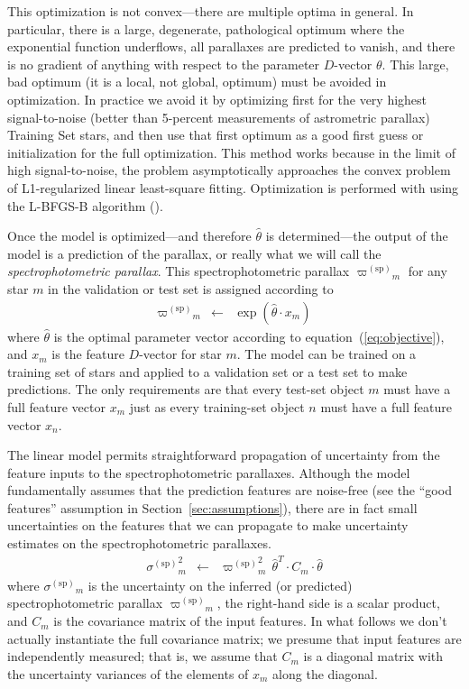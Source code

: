 \documentclass[modern]{aastex62}
\newcommand{\sectionname}{Section}
\newcommand{\equationname}{equation}
\newcommand{\code}[1]{\texttt{\detokenize{#1}}}
\newcommand{\acronym}[1]{{\small{#1}}}
\newcommand{\sparallax}{{\varpi^{(\mathrm{sp})}}}
\newcommand{\ssigma}{{\sigma^{(\mathrm{sp})}}}
\begin{document}
This optimization is not convex---there are multiple optima in general.
In particular, there is a large, degenerate, pathological optimum where
the exponential function underflows, all parallaxes are predicted to vanish,
and there is no gradient of anything with respect to the parameter $D$-vector $\theta$.
This large, bad optimum (it is a local, not global, optimum) must be avoided in optimization.
In practice we avoid it by optimizing first for the very highest signal-to-noise
(better than 5-percent measurements of astrometric parallax)
Training Set stars, and then use that first optimum as a
good first guess or initialization for the full optimization.
This method works because in the limit of high signal-to-noise, the problem asymptotically approaches
the convex problem of L1-regularized linear least-square fitting.
Optimization is performed with \code{scipy.optimize} using the
\acronym{L-BFGS-B} algorithm (\citealt{lbfgsb}).

Once the model is optimized---and therefore $\hat{\theta}$ is determined---the
output of the model is a prediction of the parallax,
or really what we will call the \emph{spectrophotometric parallax}.
This spectrophotometric parallax
$\sparallax_m$ for any star $m$ in the validation or test set is
assigned according to
\begin{eqnarray}
\sparallax_m &\leftarrow& \exp(\hat{\theta}\cdot x_m)
\end{eqnarray}
where
$\hat{\theta}$ is the optimal parameter vector according
to \equationname~(\ref{eq:objective}),
and
$x_m$ is the feature $D$-vector for star $m$.
The model can be trained on a training set of stars and applied to
a validation set or a test set to make predictions.
The only requirements are that every test-set object $m$  must have a full feature
vector $x_m$ just as every training-set object $n$ must have a full feature
vector $x_n$.

The linear model permits straightforward propagation of uncertainty from the
feature inputs to the spectrophotometric parallaxes.
Although the model fundamentally assumes that the prediction features are noise-free
(see the ``good features'' assumption in \sectionname~\ref{sec:assumptions}),
there are in fact small uncertainties on the features that we can propagate to 
make uncertainty estimates on the spectrophotometric parallaxes.
\begin{eqnarray}
\ssigma_m^2 &\leftarrow& \sparallax_m^2\,\hat{\theta}^T\cdot C_m\cdot\hat{\theta}
\label{eq:unc}
\end{eqnarray}
where $\ssigma_m$ is the uncertainty on the inferred (or predicted)
spectrophotometric parallax $\sparallax_m$,
the right-hand side is a scalar product,
and $C_m$ is the covariance matrix of the input
features.
In what follows we don't actually instantiate the full covariance matrix; we presume
that input features are independently measured;
that is, we assume that $C_m$ is a diagonal matrix with the uncertainty variances of the elements
of $x_m$ along the diagonal.
\end{document}
